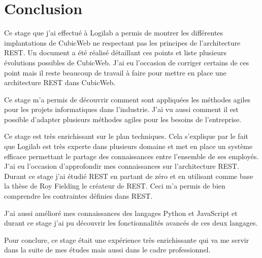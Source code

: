 \chapter*{Conclusion} 
Ce stage que j'ai effectué à Logilab a permis de montrer les différentes 
implantations de CubicWeb ne respectant pas les principes de l'architecture 
REST. Un document a été réalisé détaillant ces points et liste plusieurs 
évolutions possibles de CubicWeb. J'ai eu l'occasion de corriger certains de 
ces point mais il reste beaucoup de travail à faire pour mettre en place une 
architecture REST dans CubicWeb.     

Ce stage m'a permis de découvrir comment sont appliquées les méthodes agiles
pour les projets informatiques dans l'industrie. J'ai vu aussi comment il est
possible d'adapter plusieurs méthodes agiles pour les besoins de l'entreprise.

Ce stage est très enrichissant sur le plan techniques. Cela s'explique par le
fait que Logilab est très experte dans plusieurs domaine et met en place un
système efficace permettant le partage des connaissances entre l'ensemble de
ses employés. J'ai eu l'occasion d'approfondir mes connaissances sur
l'architecture REST. Durant ce stage j'ai étudié REST en partant de zéro et en
utilisant comme base la thèse de Roy Fielding le créateur de REST. Ceci m'a
permis de bien comprendre les contraintes définies dans REST. 

J'ai aussi amélioré mes connaissances des langages Python et JavaScript et
durant ce stage j'ai pu découvrir les fonctionnalités avancés de ces deux
langages. 

Pour conclure, ce stage était une expérience très enrichissante qui va me
servir dans la suite de mes études mais aussi dans le cadre professionnel.
